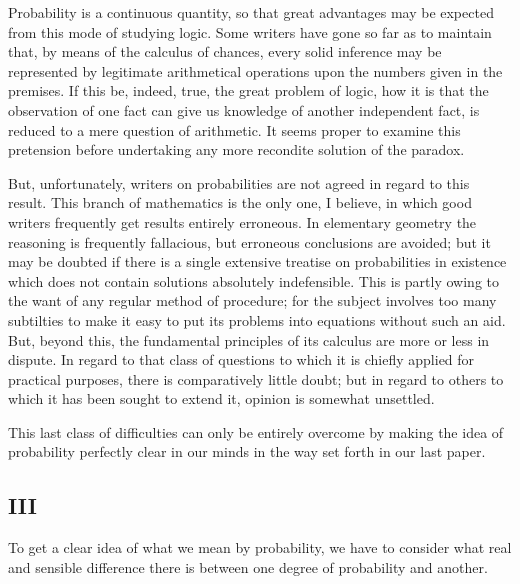 Probability is a continuous quantity, so that great advantages may be expected from this mode of studying logic. Some writers have gone so far as to maintain that, by means of the calculus of chances, every solid inference may be represented by legitimate arithmetical operations upon the numbers given in the premises. If this be, indeed, true, the great problem of logic, how it is that the observation of one fact can give us knowledge of another independent fact, is reduced to a mere question of arithmetic. It seems proper to examine this pretension before undertaking any more recondite solution of the paradox.

But, unfortunately, writers on probabilities are not agreed in regard to this result. This branch of mathematics is the only one, I believe, in which good writers frequently get results entirely erroneous. In elementary geometry the reasoning is frequently fallacious, but erroneous conclusions are avoided; but it may be doubted if there is a single extensive treatise on probabilities in existence which does not contain solutions absolutely indefensible. This is partly owing to the want of any regular method of procedure; for the subject involves too many subtilties to make it easy to put its problems into equations without such an aid. But, beyond this, the fundamental principles of its calculus are more or less in dispute. In regard to that class of questions to which it is chiefly applied for practical purposes, there is comparatively little doubt; but in regard to others to which it has been sought to extend it, opinion is somewhat unsettled.

This last class of difficulties can only be entirely overcome by making the idea of probability perfectly clear in our minds in the way set forth in our last paper.

\subsection*{III}

To get a clear idea of what we mean by probability, we have to consider what real and sensible difference there is between one degree of probability and another.

